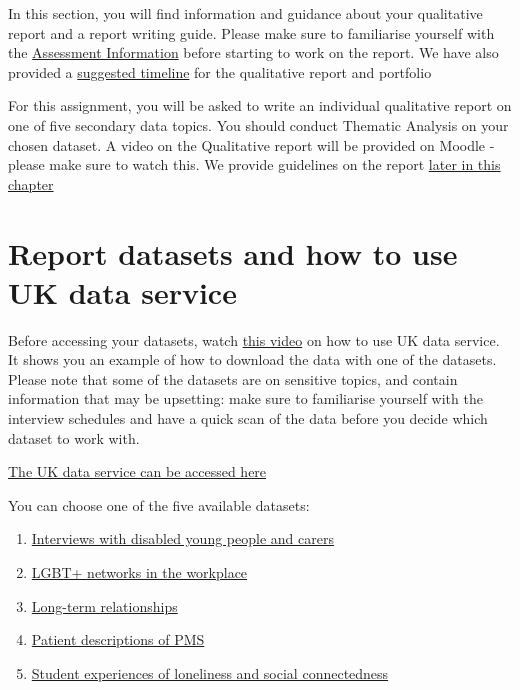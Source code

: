 \documentclass[
  english,
  letterpaper,
  DIV=11,
  numbers=noendperiod]{scrreprt}
\providecommand{\tightlist}{%
  \setlength{\itemsep}{0pt}\setlength{\parskip}{0pt}}
\begin{document}
In this section, you will find information and guidance about your
qualitative report and a report writing guide. Please make sure to
familiarise yourself with the \hyperref[ch4_AIS_report]{Assessment
Information} before starting to work on the report. We have also
provided a
\href{https://gla-my.sharepoint.com/:w:/g/personal/ashley_robertson_glasgow_ac_uk/EQM2Fzsi0FJAlDKTJXgi7-8Brm7ITIBw5ta3MaXSiDZfrg?e=FMLoM4}{suggested
timeline} for the qualitative report and portfolio

For this assignment, you will be asked to write an individual
qualitative report on one of five secondary data topics. You should
conduct Thematic Analysis on your chosen dataset. A video on the
Qualitative report will be provided on Moodle - please make sure to
watch this. We provide guidelines on the report
\hyperref[qual_report_guide]{later in this chapter}

\section{Report datasets and how to use UK data
service}\label{report-datasets-and-how-to-use-uk-data-service}

Before accessing your datasets, watch
\href{https://echo360.org.uk/media/ac815f47-bb97-40cc-8c34-d82d74e4bb0e/public}{this
video} on how to use UK data service. It shows you an example of how to
download the data with one of the datasets. Please note that some of the
datasets are on sensitive topics, and contain information that may be
upsetting: make sure to familiarise yourself with the interview
schedules and have a quick scan of the data before you decide which
dataset to work with.

\href{https://beta.ukdataservice.ac.uk/myaccount/login}{The UK data
service can be accessed here}

You can choose one of the five available datasets:

\begin{enumerate}
\def\labelenumi{\arabic{enumi}.}
\tightlist
\item
  \href{https://datacatalogue.ukdataservice.ac.uk/studies/study/854556?type=reshare\#details}{Interviews
  with disabled young people and carers}
\item
  \href{https://datacatalogue.ukdataservice.ac.uk/studies/study/855322?type=reshare\#details}{LGBT+
  networks in the workplace}
\item
  \href{https://datacatalogue.ukdataservice.ac.uk/studies/study/851244?type=reshare\#details}{Long-term
  relationships}
\item
  \href{https://datacatalogue.ukdataservice.ac.uk/studies/study/855486?type=reshare\#details}{Patient
  descriptions of PMS}
\item
  \href{https://datacatalogue.ukdataservice.ac.uk/studies/study/856114?type=reshare\#details}{Student
  experiences of loneliness and social connectedness}
\end{enumerate}
\end{document}
